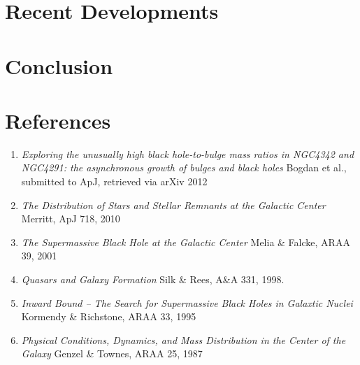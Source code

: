 \documentclass[12pt]{article}
\begin{document}
\section{Recent Developments}
\section{Conclusion}
\section*{References}
\begin{enumerate}
\item \textit{Exploring the unusually high black hole-to-bulge mass ratios in 
NGC4342 and NGC4291: the asynchronous growth of bulges and black holes} Bogdan 
et al.,  submitted to ApJ, retrieved via arXiv 2012
\item \textit{The Distribution of Stars and Stellar Remnants at the Galactic 
Center} Merritt, ApJ 718, 2010
\item \textit{The Supermassive Black Hole at the Galactic Center} Melia \& 
Falcke, ARAA 39, 2001
\item \textit{Quasars and Galaxy Formation} Silk \& Rees, A\&A 331, 1998.
\item \textit{Inward Bound -- The Search for Supermassive Black Holes in 
Galaxtic Nuclei} Kormendy \& Richstone, ARAA 33, 1995
\item \textit{Physical Conditions, Dynamics, and Mass Distribution in the Center
of the Galaxy} Genzel \& Townes, ARAA 25, 1987
\end{enumerate}
\end{document}
